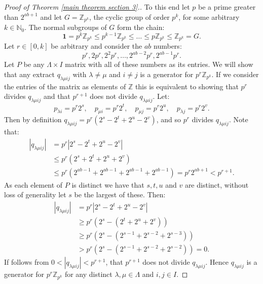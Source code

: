 \documentclass[a4paper, 12pt,reqno]{amsart}
\theoremstyle{plain}
\theoremstyle{definition}
\theoremstyle{remark}
\newcommand{\N}{\mathbb{N}}
\newcommand{\Z}{\mathbb{Z}}
\begin{document}
\begin{proof}[Proof of Theorem \ref{main theorem section 3}.]
    To this end let $p$ be a prime greater than $2^{ab+1} $ and let $G = \Z_{p^k}$, the cyclic group of order $p^k$, for some arbitrary $k \in \N_0$.
    The normal subgroups of $G$ form the chain:
    \begin{equation*}
    \textbf{1} = p^k \Z_{p^k} \leq p^{k-1} \Z_{p^k} \leq \dots \leq p \Z_{p^k} \leq \Z_{p^k} = G.
    \end{equation*}
    Let $r \in [0,k]$ be arbitrary and consider the $ab$ numbers:
    \begin{equation*}
        p^r,2p^r, 2^2 p^r, \dots,2^{ab-2} p^r , 2^{ab-1} p^r.
    \end{equation*}
    Let $P$ be any $\Lambda \times I$ matrix with all of these numbers as its entries.
    We will show that any extract $q_{\lambda \mu i j}$ with $\lambda \neq \mu$ and $i \neq j$ is a generator for $p^r \Z_{p^k}$. 
    If we consider the entries of the matrix as elements of $\Z$ this is equivalent to showing that $p^r$ divides $q_{\lambda \mu i j}$ and that $p^{r+1}$ does not divide $q_{\lambda \mu i j }$. Let:
    \begin{equation*}
        p_{\lambda i} = p^r 2^s, \quad p_{\mu i} = p^r 2^t, \quad p_{\mu j} = p^r 2^u, \quad p_{\lambda j } = p^r 2^v.
    \end{equation*}
    Then by definition $q_{\lambda \mu i j} = p^r(2^s - 2^t + 2^u - 2^v)$, and so $p^r$ divides $q_{\lambda \mu i j}$. 
    Note that:
    \begin{align*}
        | q_{\lambda \mu i j}| & = p^r| 2^s - 2^t +2^u -2^v| \\
        & \leq  p^r( 2^s + 2^t +2^u +2^v) \\
        & \leq p^r(2^{ab - 1} + 2^{ab - 1} + 2^{ab - 1} + 2^{ab - 1}) = p^r2^{ab+1} < p^{r+1}.
    \end{align*}
    As each element of $P$ is distinct we have that $s,t,u$ and $v$ are distinct, without loss of generality let $s$ be the largest of these.
    Then:
    \begin{align*}
        | q_{\lambda \mu i j}| & = p^r|2^s - 2^t + 2^u -2^v|\\
        & \geq p^r(2^s - (2^t +2^u + 2^v)) \\
        & \geq p^r(2^s - (2^{s-1} + 2^{s-2} + 2^{s-3})) \\
        & > p^r(2^s - (2^{s-1} + 2^{s-2} + 2^{s-2})) = 0.
    \end{align*}
    If follows from $0 < |q_{\lambda \mu i j}| < p^{r+1}$, that $p^{r+1}$ does not divide $q_{\lambda \mu i j}$.
    Hence $q_{\lambda \mu i j}$ is a generator for $p^r\Z_{p^k}$ for any distinct $\lambda ,\mu \in \Lambda$ and $i,j \in I$.
    

\end{proof}
\end{document}
